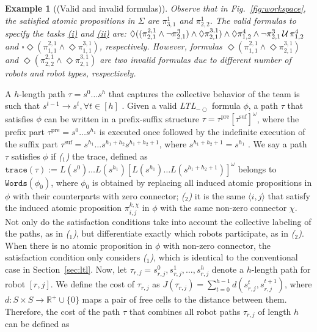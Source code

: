 \documentclass[Afour,sageh,times]{sagej}
\newtheorem{exmp}{Example}
\newcounter{mycounter}
\newcommand{\ltl}{ {\it LTL}$_{-\bigcirc}$ }
\newcommand{\ag}[2]{\langle#1,#2\rangle}
\renewcommand{\ap}[3]{\mathcal{\pi}_{{#1},{#2}}^{#3}}
\newenvironment{cexmp}
{\addtocounter{exmp}{-1}\begin{exmp}}
  {\end{exmp}}
\begin{document}
 \begin{cexmp} [(Valid and invalid formulas)]
Observe that in Fig.~\ref{fig:workspace}, the satisfied atomic propositions in $\Sigma$ are $\ap{3}{1}{1}$ and $\ap{2}{2}{1}$.   The valid formulas to specify the tasks \hyperref[task:i]{\it (i)} and \hyperref[task:ii]{\it (ii)} are: $\Diamond \Large((\ap{2}{1}{2,1}\wedge \neg \ap{2}{1}{3}) \wedge  \Diamond \ap{2}{1}{3,1}\Large)  \wedge \Diamond \ap{1}{2}{4} \wedge \neg \ap{2}{1}{3} \,\mathcal{U}\, \ap{1}{2}{4}$ and $\square \Diamond (\ap{1}{1}{2,1} \wedge \Diamond \ap{1}{1}{3,1})$, respectively. However, formulas $\Diamond (\ap{1}{1}{2,1} \wedge \Diamond \ap{2}{1}{3,1})$ and $\Diamond (\ap{2}{2}{2,1} \wedge \Diamond \ap{2}{1}{3,1})$ are two invalid formulas due to different number of robots and robot types, respectively.
 \end{cexmp}
 A $h$-length path $\tau = s^0 \ldots s^h$ that captures the collective behavior of the team is such that $s^{t-1}\to s^{t}, \forall t\in[h]$%
 .  Given a valid\ltl formula $\phi$, a  path $\tau$ that satisfies $\phi$ can be written in a prefix-suffix structure $\tau=\tau^{\text{pre}}[\tau^{\text{suf}}]^\omega$, where the prefix part  $\tau^{\text{pre}}=s^0 \dots s^{h_1}$ is executed once followed by the indefinite execution of the suffix part $\tau^{\text{suf}}=s^{h_1} \dots s^{h_1+h_2} s^{h_1+h_2+1}$, where $s^{h_1+h_2+1}=s^{h_1}$ \citep{baier2008principles}. We say a path $\tau$ satisfies $\phi$ if {\it ($_1$)} the trace, defined as $\texttt{trace}(\tau):=L(s^0)\dots L(s^{h_1})[L(s^{h_1})\dots L(s^{h_1+h_2+1})]^{\omega}$  belongs to $\texttt{Words}(\phi_0)$, where $\phi_0$ is obtained by replacing all induced atomic propositions in $\phi$ with their counterparts with zero connector; {\it ($_2$)} it is the same $\ag{i}{j}$ that satisfy the induced atomic proposition $\ap{i}{j}{k,\chi}$ in $\phi$ with the same non-zero connector $\chi$. Not only do the satisfaction conditions take into account the collective labeling of the paths, as in {\it ($_1$)}, but differentiate exactly which robots participate, as in {\it ($_2$)}. When there is no atomic proposition in $\phi$ with non-zero connector, the satisfaction condition only considers {\it ($_1$)}, which is identical to the conventional case in Section~\ref{sec:ltl}. Now, let $\tau_{r,j} = s_{r,j}^0, s_{r,j}^1, \ldots, s_{r,j}^h$ denote a $h$-length path  for robot $[r,j]$. We define the cost of $\tau_{r,j}$  as $J(\tau_{r,j}) = \sum_{t=0}^{h-1} d(s_{r,j}^{t}, s_{r,j}^{t+1})$, where $d: S\times S \to \mathbb{R}^+\cup\{0\}$ maps a pair of free cells to the distance between them. Therefore, the cost of the path $\tau$ that combines all robot paths $\tau_{r,j}$ of length $h$ can be defined as
\end{document}
